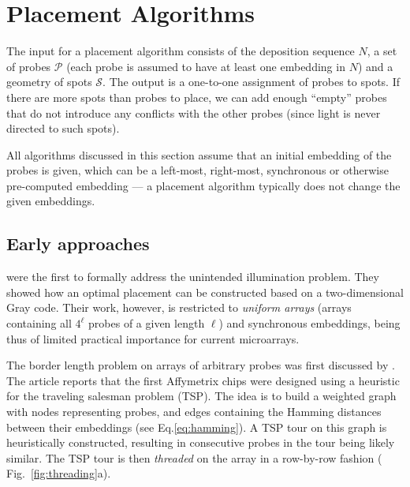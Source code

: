 \chapter{Placement Algorithms}
\label{ch:placement}

The input for a placement algorithm consists of the deposition sequence $N$, a
set of probes $\mathcal{P}$ (each probe is assumed to have at least one
embedding in $N$) and a geometry of spots $\mathcal{S}$. The output is a
one-to-one assignment of probes to spots. If there are more spots than probes to
place, we can add enough ``empty'' probes that do not introduce any conflicts
with the other probes (since light is never directed to such spots).

All algorithms discussed in this section assume that an initial embedding of the
probes is given, which can be a left-most, right-most, synchronous or otherwise
pre-computed embedding --- a placement algorithm typically does not change the
given embeddings.

\section{Early approaches}
\label{sec:placement_early}

\citet{Feldman1994} were the first to formally address the unintended
illumination problem. They showed how an optimal placement can be constructed
based on a two-dimensional Gray code. Their work, however, is restricted to
\emph{uniform arrays} (arrays containing all $4^\ell$ probes of a given length
$\ell$) and synchronous embeddings, being thus of limited practical importance
for current microarrays.

The border length problem on arrays of arbitrary probes was first discussed by
\citet{Hannenhalli2002}. The article reports that the first Affymetrix chips
were designed using a heuristic for the traveling salesman problem (TSP). The
idea is to build a weighted graph with nodes representing probes, and edges
containing the Hamming distances between their embeddings (see
Eq.\ref{eq:hamming}). A TSP tour on this graph is heuristically constructed,
resulting in consecutive probes in the tour being likely similar. The TSP tour
is then \emph{threaded} on the array in a row-by-row fashion (
Fig.~\ref{fig:threading}a).

